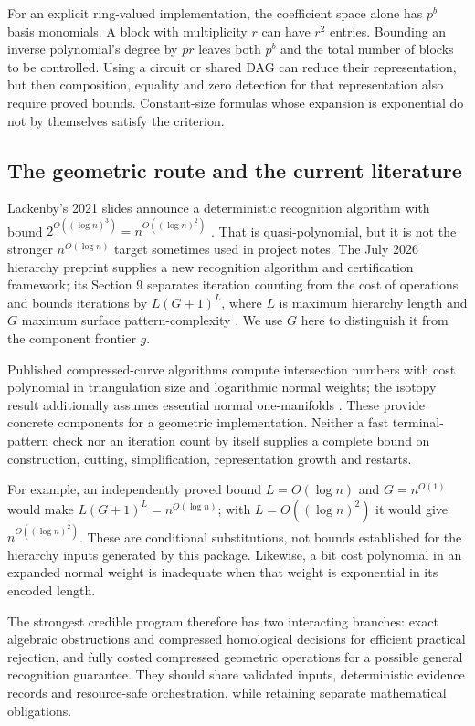 For an explicit ring-valued implementation, the coefficient space alone has
$p^b$ basis monomials. A block with multiplicity $r$ can have $r^2$
entries. Bounding an inverse polynomial's degree by $pr$ leaves both
$p^b$ and the total number of blocks to be controlled.
Using a circuit or shared DAG can reduce their representation, but then
composition, equality and zero detection for that representation also require
proved bounds. Constant-size formulas whose expansion is exponential do not
by themselves satisfy the criterion.

\subsection{The geometric route and the current literature}

Lackenby's 2021 slides announce a deterministic recognition algorithm with
bound $2^{O((\log n)^3)}=n^{O((\log n)^2)}$ \cite{lackenby2021}.
That is quasi-polynomial, but it is not the stronger
$n^{O(\log n)}$ target sometimes used in project notes.
The July 2026 hierarchy preprint supplies a new recognition algorithm and
certification framework; its Section 9 separates iteration counting from
the cost of operations and bounds iterations by $L(G+1)^L$,
where $L$ is maximum hierarchy length and $G$ maximum surface
pattern-complexity \cite{lackenby2026}. We use $G$ here to distinguish it
from the component frontier $g$.

Published compressed-curve algorithms compute intersection numbers with
cost polynomial in triangulation size and logarithmic normal weights;
the isotopy result additionally assumes essential normal one-manifolds
\cite{lackenbycurves2026}. These provide concrete components for a geometric
implementation. Neither a fast terminal-pattern check nor an iteration
count by itself supplies a complete bound on construction, cutting,
simplification, representation growth and restarts.

For example, an independently proved bound $L=O(\log n)$ and
$G=n^{O(1)}$ would make $L(G+1)^L=n^{O(\log n)}$; with
$L=O((\log n)^2)$ it would give $n^{O((\log n)^2)}$.
These are conditional substitutions, not bounds established for the
hierarchy inputs generated by this package. Likewise, a bit cost polynomial
in an expanded normal weight is inadequate when that weight is exponential
in its encoded length.

The strongest credible program therefore has two interacting branches:
exact algebraic obstructions and compressed homological decisions for
efficient practical rejection, and fully costed compressed geometric
operations for a possible general recognition guarantee. They should share
validated inputs, deterministic evidence records and resource-safe
orchestration, while retaining separate mathematical obligations.
